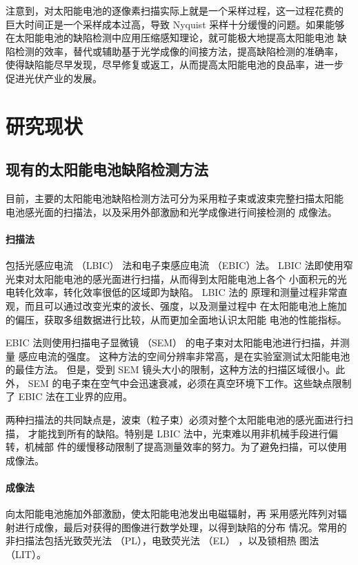 注意到，对太阳能电池的逐像素扫描实际上就是一个采样过程，这一过程花费的
巨大时间正是一个采样成本过高，导致 Nyquist 采样十分缓慢的问题。如果能够
在太阳能电池的缺陷检测中应用压缩感知理论，就可能极大地提高太阳能电池
缺陷检测的效率，替代或辅助基于光学成像的间接方法，提高缺陷检测的准确率，
使得缺陷能尽早发现，尽早修复或返工，从而提高太阳能电池的良品率，进一步
促进光伏产业的发展。

\section{研究现状}

\subsection{现有的太阳能电池缺陷检测方法}

目前，主要的太阳能电池缺陷检测方法可分为采用粒子束或波束完整扫描太阳能
电池感光面的扫描法，以及采用外部激励和光学成像进行间接检测的
成像法。

\paragraph{扫描法} 包括光感应电流 （LBIC） 法和电子束感应电流 （EBIC）法。
LBIC 法即使用窄光束对太阳能电池的感光面进行扫描，从而得到太阳能电池上各个
小面积元的光电转化效率，转化效率很低的区域即为缺陷。\cite{LBIC} LBIC 法的
原理和测量过程非常直观，而且可以通过改变光束的波长、强度，以及测量过程中
在太阳能电池上施加的偏压，获取多组数据进行比较，从而更加全面地认识太阳能
电池的性能指标。\cite{LBICEnc}

EBIC 法则使用扫描电子显微镜 （SEM） 的电子束对太阳能电池进行扫描，并测量
感应电流的强度。\cite{EBIC}
这种方法的空间分辨率非常高，是在实验室测试太阳能电池的最佳方法。
但是，受到 SEM 镜头大小的限制，这种方法的扫描区域很小。此外，
SEM 的电子束在空气中会迅速衰减，必须在真空环境下工作。这些缺点限制了 EBIC
法在工业界的应用。

两种扫描法的共同缺点是，波束（粒子束）必须对整个太阳能电池的感光面进行扫描，
才能找到所有的缺陷。特别是 LBIC 法中，光束难以用非机械手段进行偏转，机械部
件的缓慢移动限制了提高测量效率的努力。为了避免扫描，可以使用成像法。

\paragraph{成像法} 向太阳能电池施加外部激励，使太阳能电池发出电磁辐射，再
采用感光阵列对辐射进行成像，最后对获得的图像进行数学处理，以得到缺陷的分布
情况。常用的非扫描法包括光致荧光法 （PL），电致荧光法 （EL） ，以及锁相热
图法（LIT）。

